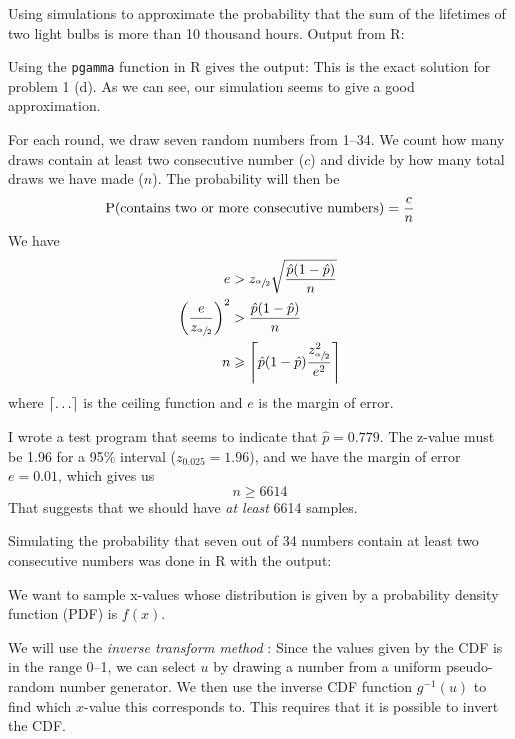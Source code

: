 \documentclass[a4paper,english,12pt]{article}
\begin{document}
Using simulations to approximate the probability that the sum of the lifetimes
of two light bulbs is more than 10 thousand hours. Output from R:

Using the \texttt{pgamma} function in R gives the output:
This is the exact solution for problem 1 (d). As we can see, our simulation
seems to give a good approximation.

For each round, we draw seven random numbers from 1--34. We count how many
draws contain at least two consecutive number ($c$) and divide by how many
total draws we have made ($n$). The probability will then be
\[
  \Prb(\text{contains two or more consecutive numbers}) = \frac{c}{n}
\]
We have
\begin{align*}
  e &> z_{\sfrac{\alpha}{2}}\sqrt{\frac{\hat{p}(1-\hat{p})}{n}} \\
  \left(\frac{e}{z_{\sfrac{\alpha}{2}}}\right)^2 &> \frac{\hat{p}(1-\hat{p})}{n} \\
  n &\geqslant \ceil*{ \hat{p}(1-\hat{p}) \frac{z_{\sfrac{\alpha}{2}}^2}{e^2} }
\end{align*}
where $\ceil{\dots}$ is the ceiling function and $e$ is the margin of
error.

I wrote a test program that seems to indicate that $\hat{p} = 0.779$. The
z-value must be 1.96 for a 95\%{} interval ($z_{0.025} = 1.96$), and we
have the margin of error $e = 0.01$, which gives us
\[
  n \geqslant 6614
\]
That suggests that we should have \textit{at least} 6614 samples.

Simulating the probability that seven out of 34 numbers contain at least two
consecutive numbers was done in R with the output:

\label{problem:3a}
We want to sample x-values whose distribution is given by a probability density
function (PDF) is $f(x)$.

We will use the \textit{inverse transform method}
\cite{wiki:inverse.transform.method}: Since the values given by the CDF is in
the range 0--1, we can select $u$ by drawing a number from a uniform
pseudo-random number generator. We then use the inverse CDF function
$g^{-1}(u)$ to find which $x$-value this corresponds to. This requires that it
is possible to invert the CDF.
\end{document}
